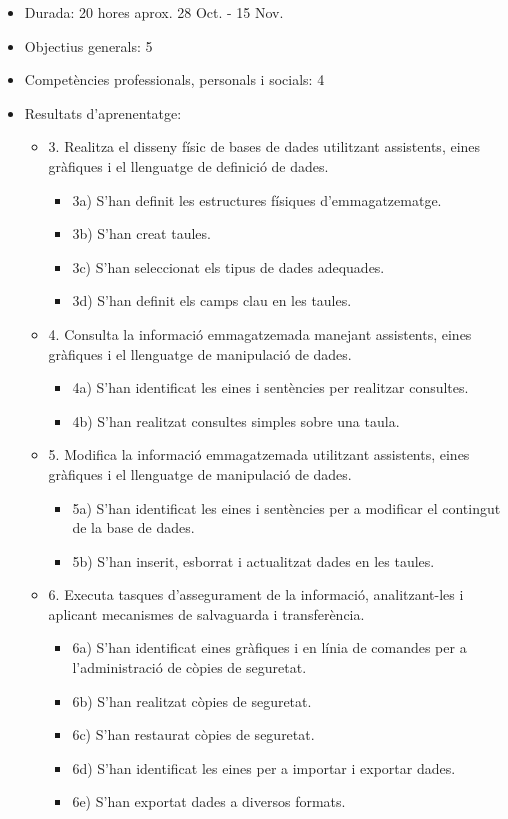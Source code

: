 \documentclass[catalan, a4paper, 12pt, titlepage]{article}
\begin{document}
  \begin{itemize}
	\item Durada: 20 hores aprox. 28 Oct. - 15 Nov.
	\item Objectius generals: 5
	\item Competències professionals, personals i socials: 4
	\item Resultats d'aprenentatge: 
		\begin{itemize}
			\item 3. Realitza el disseny físic de bases de dades utilitzant assistents, eines gràfiques i el llenguatge de definició de dades.
				\begin{itemize}
					\item 3a) S'han definit les estructures físiques d'emmagatzematge.
					\item 3b) S'han creat taules.
					\item 3c) S'han seleccionat els tipus de dades adequades.
					\item 3d) S'han definit els camps clau en les taules.
				\end{itemize}
			\item 4. Consulta la informació emmagatzemada manejant assistents, eines gràfiques i el llenguatge de manipulació de dades.
				\begin{itemize}
					\item 4a) S'han identificat les eines i sentències per realitzar consultes.
					\item 4b) S'han realitzat consultes simples sobre una taula.
				\end{itemize}
			\item 5. Modifica la informació emmagatzemada utilitzant assistents, eines gràfiques i el llenguatge de manipulació de dades.
				\begin{itemize}
					\item 5a) S'han identificat les eines i sentències per a modificar el contingut de la base de dades.
					\item 5b) S'han inserit, esborrat i actualitzat dades en les taules.
				\end{itemize}
			\item 6. Executa tasques d'assegurament de la informació, analitzant-les i aplicant mecanismes de salvaguarda i transferència.
				\begin{itemize}
					\item 6a) S'han identificat eines gràfiques i en línia de comandes per a l'administració de còpies de seguretat.
					\item 6b) S'han realitzat còpies de seguretat.
					\item 6c) S'han restaurat còpies de seguretat.
					\item 6d) S'han identificat les eines per a importar i exportar dades.
					\item 6e) S'han exportat dades a diversos formats.
				\end{itemize}
		\end{itemize}
  \end{itemize}
\end{document}
